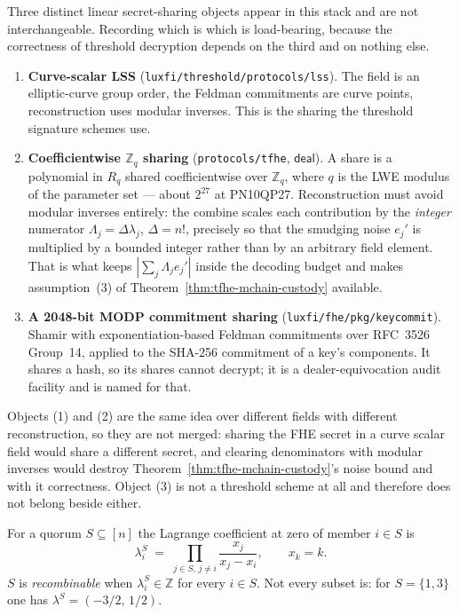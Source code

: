 \begin{remark}
\label{rem:tfhe-secret-sharing}
Three distinct linear secret-sharing objects appear in this stack and are not
interchangeable. Recording which is which is load-bearing, because the
correctness of threshold decryption depends on the third and on nothing else.
\begin{enumerate}[nosep]
  \item \textbf{Curve-scalar LSS} (\texttt{luxfi/threshold/protocols/lss}).
        The field is an elliptic-curve group order, the Feldman commitments are
        curve points, reconstruction uses modular inverses. This is the sharing
        the threshold signature schemes use.
  \item \textbf{Coefficientwise $\mathbb{Z}_q$ sharing}
        (\texttt{protocols/tfhe}, $\mathsf{deal}$). A share is a
        polynomial in $R_q$ shared coefficientwise over $\mathbb{Z}_q$, where
        $q$ is the LWE modulus of the parameter set --- about $2^{27}$ at
        PN10QP27. Reconstruction must avoid modular inverses entirely: the
        combine scales each contribution by the \emph{integer} numerator
        $\Lambda_j = \Delta \lambda_j$, $\Delta = n!$, precisely so that the
        smudging noise $e_j'$ is multiplied by a bounded integer rather than by
        an arbitrary field element. That is what keeps
        $|\sum_j \Lambda_j e_j'|$ inside the decoding budget and makes
        assumption~(3) of Theorem~\ref{thm:tfhe-mchain-custody} available.
  \item \textbf{A 2048-bit MODP commitment sharing}
        (\texttt{luxfi/fhe/pkg/keycommit}). Shamir with exponentiation-based
        Feldman commitments over RFC~3526 Group~14, applied to the SHA-256
        commitment of a key's components. It shares a hash, so its shares
        cannot decrypt; it is a dealer-equivocation audit facility and is
        named for that.
\end{enumerate}
Objects (1) and (2) are the same idea over different fields with different
reconstruction, so they are not merged: sharing the FHE secret in a curve
scalar field would share a different secret, and clearing denominators with
modular inverses would destroy Theorem~\ref{thm:tfhe-mchain-custody}'s noise
bound and with it correctness. Object (3) is not a threshold scheme at all and
therefore does not belong beside either.
\end{remark}

\begin{definition}
\label{def:tfhe-recombinable-quorum}
For a quorum $S \subseteq [n]$ the Lagrange coefficient at zero of member
$i \in S$ is
\[
  \lambda_i^S \;=\; \prod_{j \in S,\, j \neq i} \frac{x_j}{x_j - x_i},
  \qquad x_k = k .
\]
$S$ is \emph{recombinable} when $\lambda_i^S \in \mathbb{Z}$ for every
$i \in S$. Not every subset is: for $S = \{1,3\}$ one has
$\lambda^S = (-3/2,\, 1/2)$.
\end{definition}

